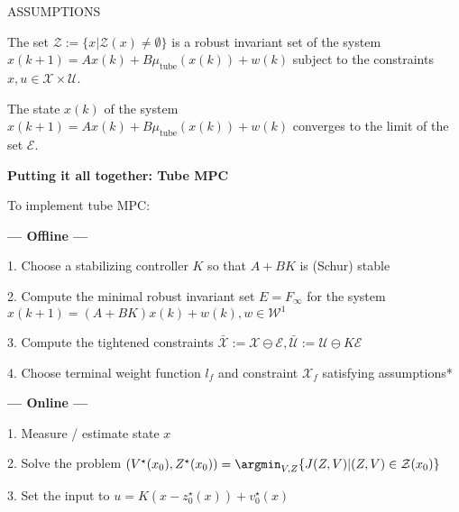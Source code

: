 ASSUMPTIONS %

\begin{theorem}
	The set $\mathcal{Z} := \{x|\mathcal{Z}(x)\neq \emptyset\}$
	is a robust invariant set of the system
	$x(k+1)= Ax(k)+B\mu_\text{tube}(x(k)) + w(k)$
	subject to the constraints
	$x, u \in \mathcal{X} \times \mathcal{U}$.
\end{theorem}



\begin{theorem}
	The state $x(k)$ of the system
	$x(k+1)= Ax(k)+B\mu_\text{tube}(x(k)) + w(k)$
	converges  to the  limit of the set $\mathcal{E}$.
\end{theorem}

\textbf{Putting it all together: Tube MPC}

To implement tube MPC:

\textbf{— Offline —}

1. Choose a stabilizing controller $K$
so that $A + BK$ is (Schur) stable

2. Compute the minimal robust invariant set
$E = F_\infty$ for the system
$x(k+1) = (A + BK)x(k) + w(k), w \in \mathcal{W}^1$

3. Compute the tightened constraints
$\bar{\mathcal{X}} := \mathcal{X} \ominus \mathcal{E},
	\bar{\mathcal{U}} := \mathcal{U} \ominus K\mathcal{E}$

4. Choose terminal weight function $l_f$
and constraint $\mathcal{X}_f$
satisfying assumptions* %

\textbf{— Online —}

1. Measure / estimate state $x$

2. Solve the problem
$(V^\star(x_0),Z^\star(x_0))=
	\argmin_{V,Z}\{J(Z,V)|(Z,V)\in\mathcal{Z}(x_0)\}$

3. Set the input to
$u	=	K(x-z_0^\star(x))+v_0^\star(x)$



